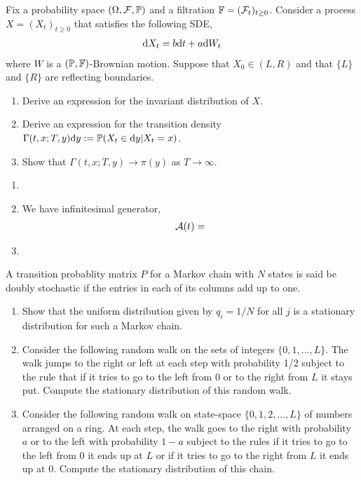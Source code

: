 \begin{problem}
Fix a probability space \( (\Omega, \mathcal{F},\mathbb{P}) \) and a filtration \( \mathbb{F} = (\mathcal{F}_t)_{t\geq 0} \). Consider a process \( X = (X_t)_{t\geq 0} \) that satisfies the following SDE,
\begin{align*}
    \mathrm{d} X_t = b\mathrm{d} t + a\mathrm{d} W_t
\end{align*}
where \( W \) is a \( (\mathbb{P},\mathbb{F}) \)-Brownian motion. Suppose that \( X_0 \in (L,R) \) and that \( \{L\} \) and \( \{R\} \) are reflecting boundaries.
\begin{enumerate}[nolistsep,label=(\alph*)]
    \item Derive an expression for the invariant distribution of \( X \).
    \item Derive an expression for the transition density \( \Gamma(t,x;T,y)\mathrm{d} y:= \mathbb{P}(X_t \in\mathrm{d} y | X_t = x) \).
    \item Show that \( \Gamma(t,x;T,y) \to \pi(y) \) as \( T\to\infty \).
\end{enumerate}
\end{problem}

\begin{solution}[Solution]
\begin{enumerate}[label=(\alph*)]
    \item
    \item We have infinitesimal generator,
        \begin{align*}
            \mathcal{A}(t) = 
        \end{align*}
        
    \item 
\end{enumerate}
\end{solution}

\begin{problem}
    A transition probablity matrix \( P \) for a Markov chain with \( N \) states is said be doubly stochastic if the entries in each of its columns add up to one.
\begin{enumerate}[nolistsep,label=(\alph*)]
\item Show that the uniform distribution given by \( q_i = 1/N \) for all \( j \) is a stationary distribution for such a Markov chain.
\item Consider the following random walk on the sets of integers \( \{0, 1, \ldots, L\} \). The walk jumps to the right or left at each step with probability 1/2 subject to the rule that if it tries to go to the left from 0 or to the right from \( L \) it stays put. Compute the stationary distribution of this random walk.
\item Consider the following random walk on state-space \( \{0, 1, 2, \ldots, L\} \) of numbers arranged on a ring. At each step, the walk goes to the right with probability \( a \) or to the left with probability \( 1 - a \) subject to the rules if it tries to go to the left from 0 it ends up at \( L \) or if it tries to go to the right from \( L \) it ends up at 0. Compute the stationary distribution of this chain.
\end{enumerate}
\end{problem}

